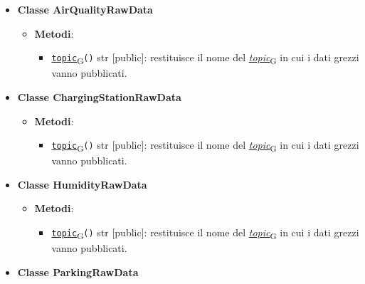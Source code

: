 \begin{itemize}
\begin{itemize}
\begin{itemize}
		            \end{itemize}
	      \end{itemize}
	\item \textbf{Classe AirQualityRawData}
	      \begin{itemize}
		      \item \textbf{Metodi}:
		            \begin{itemize}
			            \item \href{https://7last.github.io/docs/pb/documentazione-interna/glossario\#topic}{\texttt{topic}\textsubscript{G}}\texttt{()} str [public]: restituisce il nome del \href{https://7last.github.io/docs/pb/documentazione-interna/glossario\#topic}{\textit{topic}\textsubscript{G}} in cui i dati grezzi vanno pubblicati.
		            \end{itemize}
	      \end{itemize}
	\item \textbf{Classe ChargingStationRawData}
	      \begin{itemize}
		      \item \textbf{Metodi}:
		            \begin{itemize}
			            \item \href{https://7last.github.io/docs/pb/documentazione-interna/glossario\#topic}{\texttt{topic}\textsubscript{G}}\texttt{()} str [public]: restituisce il nome del \href{https://7last.github.io/docs/pb/documentazione-interna/glossario\#topic}{\textit{topic}\textsubscript{G}} in cui i dati grezzi vanno pubblicati.
		            \end{itemize}
	      \end{itemize}
	\item \textbf{Classe HumidityRawData}
	      \begin{itemize}
		      \item \textbf{Metodi}:
		            \begin{itemize}
			            \item \href{https://7last.github.io/docs/pb/documentazione-interna/glossario\#topic}{\texttt{topic}\textsubscript{G}}\texttt{()} str [public]: restituisce il nome del \href{https://7last.github.io/docs/pb/documentazione-interna/glossario\#topic}{\textit{topic}\textsubscript{G}} in cui i dati grezzi vanno pubblicati.
		            \end{itemize}
	      \end{itemize}
	\item \textbf{Classe ParkingRawData}
	      \begin{itemize}

\end{itemize}
\end{itemize}
